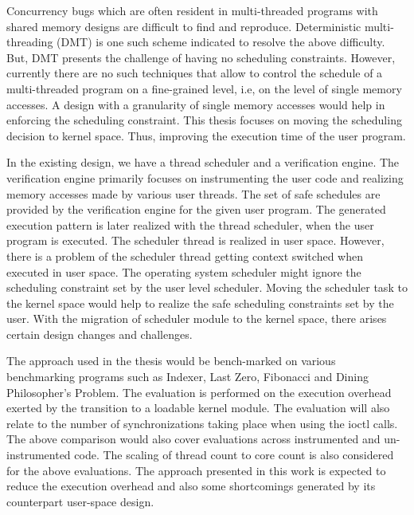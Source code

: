 Concurrency bugs which are often resident in multi-threaded programs with shared memory designs are difficult to find and reproduce. 
Deterministic multi-threading (DMT) is one such scheme indicated to resolve the above difficulty. 
But, DMT presents the challenge of having no scheduling constraints.  
However, currently there are no such techniques that allow to control the schedule of a multi-threaded program on a fine-grained level, i.e, on the level of single memory accesses. 
A design with a granularity of single memory accesses would help in enforcing the scheduling constraint. 
This thesis focuses on moving the scheduling decision to kernel space. 
Thus, improving the execution time of the user program.

In the existing design, we have a thread scheduler and a verification engine.  
The verification engine primarily focuses on instrumenting the user code and realizing memory accesses made by various user threads. 
The set of safe schedules are provided by the verification engine for the given user program. 
The generated execution pattern is later realized with the thread scheduler, when the user program is executed. 
The scheduler thread is realized in user space. 
However, there is a problem of the scheduler thread getting context switched when executed in user space. 
The operating system scheduler might ignore the scheduling constraint set by the user level scheduler. 
Moving the scheduler task to the kernel space would help to realize the safe scheduling constraints set by the user. 
With the migration of scheduler module to the kernel space, there arises certain design changes and challenges. 

The approach used in the thesis would be bench-marked on various benchmarking programs such as Indexer, Last Zero, Fibonacci and Dining Philosopher's Problem.  
The evaluation is performed on the execution overhead exerted by the transition to a loadable kernel module. 
The evaluation will also relate to the number of synchronizations taking place when using the ioctl calls. 
The above comparison would also cover evaluations across instrumented and un-instrumented code. 
The scaling of thread count to core count is also considered for the above evaluations. 
The approach presented in this work is expected to reduce the execution overhead and also some shortcomings generated by its counterpart user-space design. 